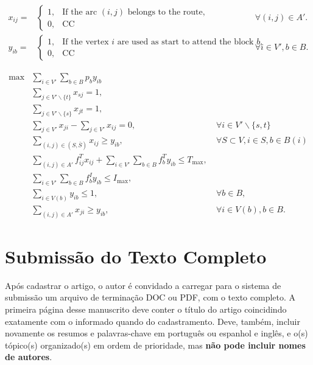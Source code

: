 \documentclass[a4paper,11pt]{article}
\begin{document}
\begin{align}
  \nonumber x_{ij} = & \begin{cases}
                         1, & \text{If the arc $(i, j)$ belongs to the route,} \\
                         0, & \text{CC} 
                       \end{cases} & \forall (i, j) \in A'. \\
  \nonumber y_{ib} = & \begin{cases}
                         1, & \text{If the vertex $i$ are used as start to attend the block $b$,} \\
                         0, & \text{CC} 
                       \end{cases} & \forall i \in V', b \in B.
\end{align}


\begin{align}
  \max & \sum_{i \in V'} \sum_{b \in B} p_b y_{ib} & \\
       & \sum_{j \in V'\backslash \{t\}} x_{sj} = 1, & \\
       & \sum_{j \in V'\backslash \{s\}} x_{jt} = 1, & \\
       & \sum_{j \in V'} x_{ji} - \sum_{j \in V'} x_{ij} = 0, & \ \forall i \in V' \backslash \{s, t\} \\
       & \sum_{(i, j) \in (S, \bar{S})} x_{ij} \geq y_{ib}, & \ \forall S \subset V, i \in S, b \in B(i) \\
       & \sum_{(i, j) \in A'} f^T_{ij} x_{ij} + \sum_{i \in V'} \sum_{b \in B} f^T_b y_{ib} \leq T_{\max}, & \\
       & \sum_{i \in V'} \sum_{b \in B} f^I_b y_{ib} \leq I_{\max}, & \\
       & \sum_{i \in V(b)} y_{ib} \leq 1, & \ \forall b \in B, \\
       & \sum_{(i, j) \in A'} x_{ji} \geq y_{ib}, & \ \forall i \in V(b), b \in B.
\end{align}



\section{Submiss\~ao do Texto Completo}

Ap\'os cadastrar o artigo, o autor \'e convidado a carregar para o sistema de submiss\~ao um arquivo 
de termina\-\c c\~ao DOC ou PDF, com o texto completo. 
A primeira p\'agina desse manuscrito deve conter o t\'itulo do artigo coincidindo exatamente com o informado quando do cadastramento. 
Deve, tamb\'em, incluir novamente os resumos e palavras-chave em portugu\^es ou espanhol e ingl\^es, e o(s) t\'opico(s) organizado(s) 
em ordem de prioridade, mas \textbf{n\~ao pode incluir nomes de autores}.
\end{document}
